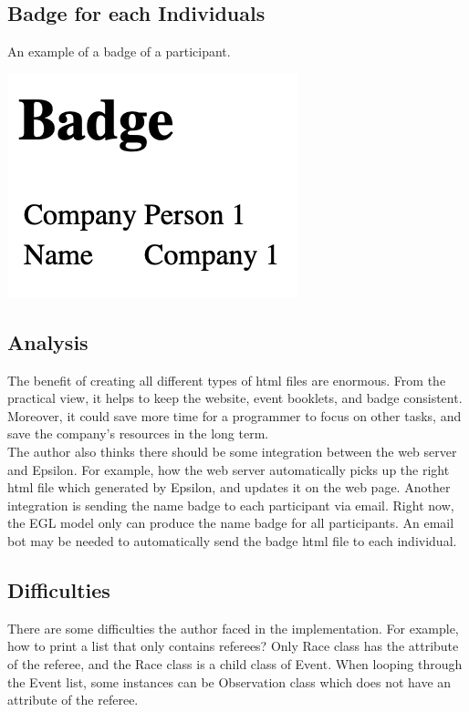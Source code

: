 \documentclass[12pt]{article}
\begin{document}
\subsection{Badge for each Individuals}
An example of a badge of a participant.

\includegraphics[scale = 0.6]{img/badge}

\subsection{Analysis}
The benefit of creating all different types of html files are enormous. From the practical view, it helps to keep the website, 
event booklets, and badge consistent. Moreover, it could save more time for a programmer to focus on other tasks, and save the 
company's resources in the long term.
\\
The author also thinks there should be some integration between the web server and Epsilon. For example, how the web server 
automatically picks up the right html file which generated by Epsilon, and updates it on the web page. Another integration 
is sending the name badge to each 
participant via email. Right now, the EGL model only can produce the name badge for all participants. An email bot may be needed 
to automatically send the badge html file to each individual.

\subsection{Difficulties}
There are some difficulties the author faced in the implementation. For example, how to print a list that only contains referees? 
Only Race class has the attribute of the referee, and the Race class is a child class of Event. When looping through 
the Event list, some instances can be Observation class which does not have an attribute of the referee.
\end{document}
